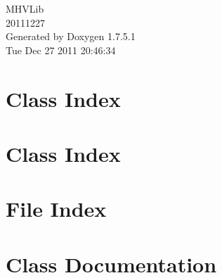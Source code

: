 \documentclass[a4paper]{book}
\begin{document}
\hypersetup{pageanchor=false,citecolor=blue}
\begin{titlepage}
\vspace*{7cm}
\begin{center}
{\Large \-M\-H\-V\-Lib \\[1ex]\large 20111227 }\\
\vspace*{1cm}
{\large \-Generated by Doxygen 1.7.5.1}\\
\vspace*{0.5cm}
{\small Tue Dec 27 2011 20:46:34}\\
\end{center}
\end{titlepage}
\clearemptydoublepage
{}
\tableofcontents
\clearemptydoublepage
{}
\hypersetup{pageanchor=true,citecolor=blue}
\chapter{\-Class \-Index}

\chapter{\-Class \-Index}

\chapter{\-File \-Index}

\chapter{\-Class \-Documentation}











































\end{document}
